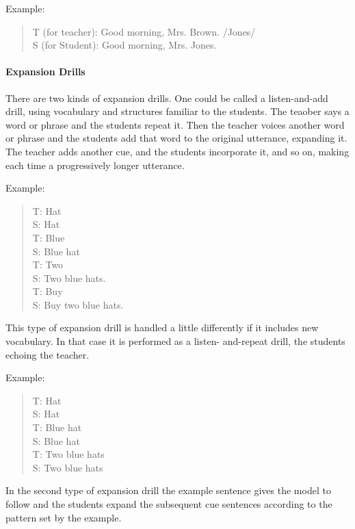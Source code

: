 \noindent Example:

\begin{quote}
T (for teacher): Good morning, Mrs. Brown. /Jones/ \\
S (for Student): Good morning, Mrs. Jones. \\
\end{quote}

\paragraph{Expansion Drills}

There are two kinds of expansion drills. One could be called a listen-and-add drill, using vocabulary and structures familiar to the students. The teaober says a word or phrase and the students repeat it. Then the teacher voices another word or phrase and the students add that word to the original utterance, expanding it. The teacher adds another cue, and the students incorporate it, and so on, making each time a progressively longer utterance.

\noindent Example:

\begin{quote}
T: Hat \\
S: Hat \\
T: Blue \\
S: Blue hat \\
T: Two \\
S: Two blue hats. \\
T: Buy \\
S: Buy two blue hats. \\
\end{quote}

This type of expansion drill is handled a little differently if it includes new vocabulary. In that case it is performed as a listen- and-repeat drill, the students echoing the teacher.

\noindent Example:

\begin{quote}
T: Hat \\
S: Hat \\
T: Blue hat \\
S: Blue hat \\
T: Two blue hats \\
S: Two blue hats \\
\end{quote}

In the second type of expansion drill the example sentence gives the model to follow and the students expand the subsequent cue sentences according to the pattern set by the example.

